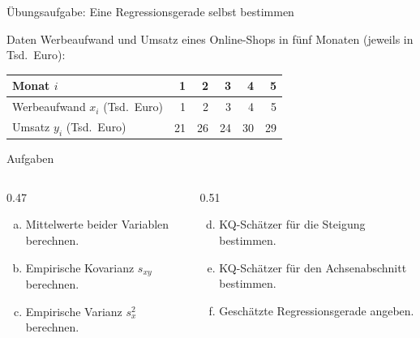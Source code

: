 \documentclass[aspectratio=169,11pt]{beamer}
\begin{document}
\begin{frame}{Übungsaufgabe: Eine Regressionsgerade selbst bestimmen}
  \begin{block}{Daten}
    Werbeaufwand und Umsatz eines Online-Shops in fünf Monaten (jeweils in Tsd.\ Euro):
    \begin{center}
      \renewcommand{\arraystretch}{1.05}
      \begin{tabular}{l*{5}{r}}
        \toprule
        Monat $i$                       & 1  & 2  & 3  & 4  & 5  \\
        \midrule
        Werbeaufwand $x_i$ (Tsd.\ Euro) & 1  & 2  & 3  & 4  & 5  \\
        Umsatz $y_i$ (Tsd.\ Euro)       & 21 & 26 & 24 & 30 & 29 \\
        \bottomrule
      \end{tabular}
    \end{center}
  \end{block}

  \begin{exampleblock}{Aufgaben}
    \begin{columns}[T]
      \begin{column}{0.47\textwidth}
        \begin{enumerate}[a)]
          \item Mittelwerte beider Variablen berechnen.
          \item Empirische Kovarianz $s_{xy}$ berechnen.
          \item Empirische Varianz $s_x^{2}$ berechnen.
        \end{enumerate}
      \end{column}
      \begin{column}{0.51\textwidth}
        \begin{enumerate}[a)]
          \setcounter{enumi}{3}
          \item KQ-Schätzer für die Steigung bestimmen.
          \item KQ-Schätzer für den Achsenabschnitt bestimmen.
          \item Geschätzte Regressionsgerade angeben.
        \end{enumerate}
      \end{column}
    \end{columns}
  \end{exampleblock}
\end{frame}
\end{document}
